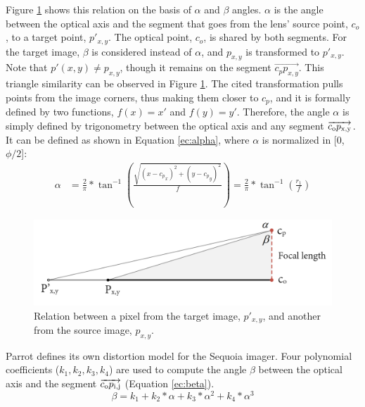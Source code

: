 Figure \ref{fig:fisheye_model} shows this relation on the basis of $\alpha$ and $\beta$ angles. $\alpha$ is the angle between the optical axis and the segment that goes from the lens' source point, $c_o$, to a target point, $p'_{x,y}$. The optical point, $c_o$, is shared by both segments. For the target image, $\beta$ is considered instead of $\alpha$, and $p_{x, y}$ is transformed to $p'_{x,y}$. Note that $p'(x, y) \neq p_{x, y}$, though it remains on the segment $\overrightarrow{c_p p_{x,y}}$. This triangle similarity can be observed in Figure \ref{fig:fisheye_model}. The cited transformation pulls points from the image corners, thus making them closer to $c_p$, and it is formally defined by two functions, $f(x) = x'$ and $f(y) = y'$. Therefore, the angle $\alpha$ is simply defined by trigonometry between the optical axis and any segment $\overrightarrow{c\textsubscript{o}p\textsubscript{x,y}}$. It can be defined as shown in Equation \ref{ec:alpha}, where $\alpha$ is normalized in [0, $\phi / 2$]:
\begin{equation}
\begin{split}
\label{ec:alpha}
\alpha & = \frac{2}{\pi} * \tan^{-1}(\frac{\sqrt{(x-{c_p}_x)^2 + (y-{c_p}_y)^2}}{f}) = \frac{2}{\pi} * \tan^{-1}(\frac{r_1}{f})
\end{split}
\end{equation}

\begin{figure}[ht]
	\centering
	\includegraphics[width=\linewidth]{figs/materials/fisheye_model.png}
	\caption{Relation between a pixel from the target image, $p'_{x,y}$, and another from the source image, $p_{x,y}$.}
	\label{fig:fisheye_model}
\end{figure}

Parrot defines its own distortion model for the Sequoia imager. Four polynomial coefficients ($k_1, k_2, k_3, k_4$) are used to compute the angle $\beta$ between the optical axis and the segment $\overrightarrow{c\textsubscript{o}p\textsubscript{i,j}}$ (Equation \ref{ec:beta}).
\begin{equation}
\label{ec:beta}
\beta = k_1 + k_2 * \alpha + k_3 * \alpha ^ 2 + k_4 * \alpha ^ 3
\end{equation}

